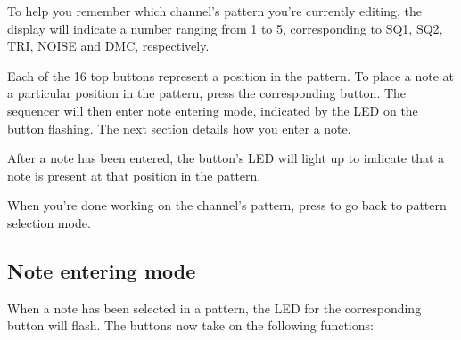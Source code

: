 \documentclass[a4paper, 12p, titlepaget]{book}
\newcommand {\btn}[1] {\framebox{\textbf{\footnotesize #1}}}
\begin{document}
To help you remember which channel's pattern you're currently editing, the display will indicate a number ranging from 1 to 5, corresponding to SQ1, SQ2, TRI, NOISE and DMC, respectively.

Each of the 16 top buttons represent a position in the pattern. To place a note at a particular position in the pattern, press the corresponding button. The sequencer will then enter note entering mode, indicated by the LED on the button flashing. The next section details how you enter a note.

After a note has been entered, the button's LED will light up to indicate that a note is present at that position in the pattern.

When you're done working on the channel's pattern, press \btn{BACK} to go back to pattern selection mode.

\subsection{Note entering mode}

When a note has been selected in a pattern, the LED for the corresponding button will flash. The buttons now take on the following functions:
\end{document}
